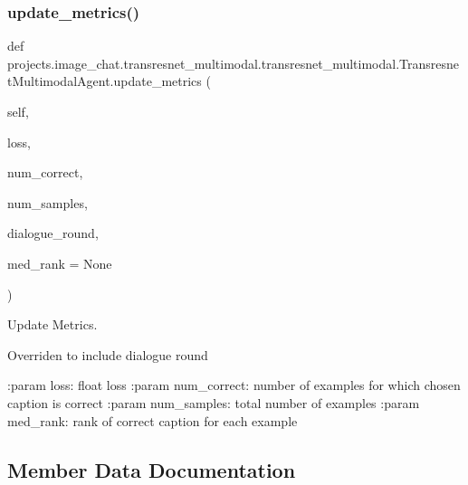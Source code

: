 \subsubsection{\texorpdfstring{update\+\_\+metrics()}{update\_metrics()}}
{\footnotesize\ttfamily def projects.\+image\+\_\+chat.\+transresnet\+\_\+multimodal.\+transresnet\+\_\+multimodal.\+Transresnet\+Multimodal\+Agent.\+update\+\_\+metrics (\begin{DoxyParamCaption}\item[{}]{self,  }\item[{}]{loss,  }\item[{}]{num\+\_\+correct,  }\item[{}]{num\+\_\+samples,  }\item[{}]{dialogue\+\_\+round,  }\item[{}]{med\+\_\+rank = {\ttfamily None} }\end{DoxyParamCaption})}

\begin{DoxyVerb}Update Metrics.

Overriden to include dialogue round

:param loss:
    float loss
:param num_correct:
    number of examples for which chosen caption is correct
:param num_samples:
    total number of examples
:param med_rank:
    rank of correct caption for each example
\end{DoxyVerb}
 

\subsection{Member Data Documentation}
\mbox{\label{classprojects_1_1image__chat_1_1transresnet__multimodal_1_1transresnet__multimodal_1_1TransresnetMultimodalAgent_a4a922732237f28673e03326d3b22d5ba}} 
